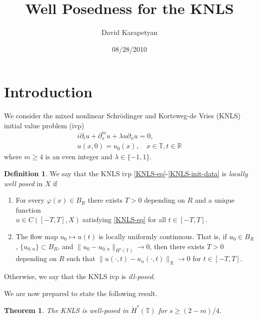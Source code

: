 \documentclass[12pt,reqno]{amsart}
\numberwithin{equation}{section}  %
\numberwithin{figure}{section}
\newcommand{\rr}{\mathbb{R}}
\newcommand{\ci}{\mathbb{T}}
\newcommand{\p}{\partial}
\newcommand{\vp}{\varphi}
\theoremstyle{plain}
\newtheorem{theorem}{Theorem}
\theoremstyle{definition}
\newtheorem{definition}{Definition}
\theoremstyle{remark}
\begin{document}
\title{Well Posedness for the KNLS}
\author{David Karapetyan}
\address{Department of Mathematics  \\
         University  of Notre Dame\\
         Notre Dame, IN 46556 }
\date{08/28/2010}
%
\maketitle
%
%
%
%
%
%
\section{Introduction}
We consider the mixed nonlinear Schr{\"o}dinger and Korteweg-de Vries (KNLS) initial value problem (ivp)
%
%
\begin{gather}
	\label{KNLS-eq}
	i\p_t u + \p_x^{m} u + \lambda u \p_x u = 0,
	\\
	\label{KNLS-init-data}
	u(x,0) = u_0(x), \quad x \in \ci, t \in \rr
\end{gather}
%
%
where $m \ge 4$ is an even integer and $\lambda \in \{-1, 1\}$.
%
%
\begin{definition}
	We say that the KNLS ivp \eqref{KNLS-eq}-\eqref{KNLS-init-data} is
	\emph{locally well posed} in
	$X$ if 
	\begin{enumerate}
		\item For every $\vp(x) \in
	B_R$ there exists $T>0$ depending on $R$ and a unique function
	\\
	$u \in C([-T, T],
	X)$ satisfying \eqref{KNLS-eq} for all $t \in [-T, T]$. 
\item The flow map $u_0 \mapsto u(t)$ is locally uniformly continuous. That is, if $u_0
	\in B_R$, $\{u_{0,n}\} \subset B_R$, and 
	$\|u_0 - u_{0, n} \|_{H^{s}(\ci)} \to 0$, then there exists $T >0$ depending
	on $R$ such that $\|u(\cdot, t) - u_{n}(\cdot,t) \|_{X} \to
	0$ for $t \in [-T, T]$. 
	\end{enumerate}
	Otherwise, we say that the KNLS ivp is \emph{ill-posed}.
\end{definition}
%
%
We are now prepared to state the following result.

%
%
%
%
%
%
\begin{theorem}
	\label{thm:main}
	The KNLS is well-posed in $\dot{H}^s(\ci)$ for $s \ge (2-m)/4$.  
\end{theorem}
%
%
%
%
%
%
%
%
\end{document}
